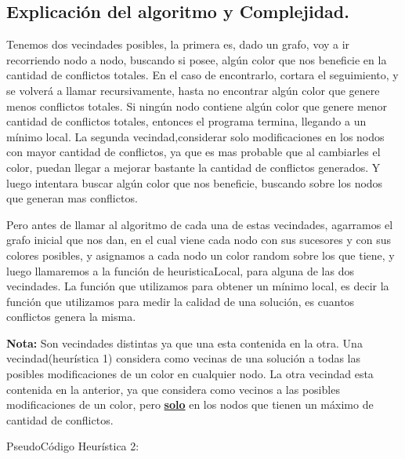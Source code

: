 \subsection{Explicación del algoritmo y Complejidad.}

\vspace*{0.3cm}

Tenemos dos vecindades posibles, la primera es, dado un grafo, voy a ir recorriendo nodo a nodo, buscando si posee, algún color que nos beneficie
en la cantidad de conflictos totales. En el caso de encontrarlo, cortara el seguimiento, y se volverá a llamar recursivamente, hasta no encontrar
algún color que genere menos conflictos totales. Si ningún nodo contiene algún color que genere menor cantidad de conflictos totales, entonces 
el programa termina, llegando a un mínimo local.
La segunda vecindad,considerar solo modificaciones en los nodos con mayor cantidad de conflictos, ya que es mas probable que al cambiarles el color, puedan
llegar a mejorar bastante la cantidad de conflictos generados. Y luego intentara buscar algún color que nos beneficie, buscando sobre los nodos
que generan mas conflictos.

Pero antes de llamar al algoritmo de cada una de estas vecindades, agarramos el grafo inicial que nos dan, en el cual viene cada nodo con sus sucesores y con sus colores posibles, y asignamos a cada nodo un color random sobre los que tiene, y luego llamaremos a la función de heuristicaLocal, para alguna de las dos vecindades. La función que utilizamos para obtener un mínimo local, es decir la función que utilizamos para medir la calidad de una solución, es cuantos conflictos genera la misma.

\textbf{ Nota:} Son vecindades distintas ya que una esta contenida en la otra. Una vecindad(heurística 1) considera como vecinas de una solución a todas las posibles modificaciones de un color en cualquier nodo. La otra vecindad esta contenida en la anterior, ya que considera como vecinos a las posibles modificaciones de un color, pero  \textbf{\underline{solo}} en los nodos que tienen un máximo de cantidad de conflictos.

PseudoCódigo Heurística 2:


